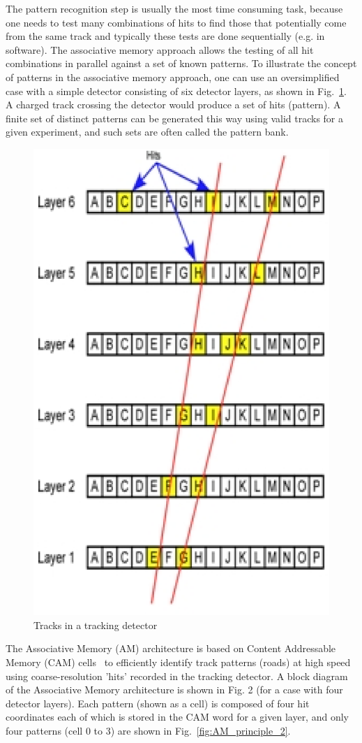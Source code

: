 \noindent The pattern recognition step is usually the most time consuming task, because one needs to test many combinations of hits to find those that potentially come from the same track and typically these tests are done sequentially (e.g. in software). The associative memory approach allows the testing of all hit combinations in parallel against a set of known patterns. To illustrate the concept of patterns in the associative memory approach, one can use an oversimplified case with a simple detector consisting of six detector layers, as shown in Fig.~\ref{fig:AM_principle_1}. A charged track crossing the detector would produce a set of hits (pattern). A finite set of distinct patterns can be generated this way using valid tracks for a given experiment, and such sets are often called the pattern bank. 

\begin{figure}[ht!]
\centering
\includegraphics[width=0.4\columnwidth]{Plots/AM_pple2.eps}
\caption{Tracks in a tracking detector}
\label{fig:AM_principle_1}
\end{figure}

\noindent The Associative Memory (AM) architecture is based on Content Addressable Memory (CAM) cells~\cite{bib:Koh-87,bib:Pag-06} to efficiently identify track patterns (roads) at high speed using coarse-resolution 'hits' recorded in the tracking detector. A block diagram~\cite{bib:Rist-89} of the Associative Memory architecture is shown in Fig. 2 (for a case with four detector layers).  Each pattern (shown as a cell) is composed of four hit coordinates each of which is stored in the CAM word for a given layer, and only four patterns (cell 0 to 3) are shown in Fig.~\ref{fig:AM_principle_2}. 

